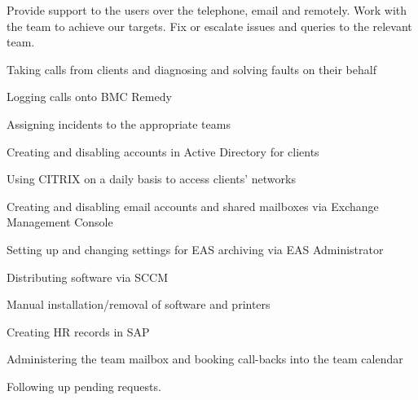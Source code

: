 \documentclass[a4paper]{deedy-resume}
\begin{document}
\begin{minipage}[t]{0.60\textwidth}
\item Provide support to the users over the telephone, email and remotely. Work with
the team to achieve our targets. Fix or escalate issues and queries to the relevant
team.
\sectionspace
\begin{tightitemize}
\item Taking calls from clients and diagnosing and solving faults on their behalf 
\item Logging calls onto BMC Remedy 
\item Assigning incidents to the appropriate teams
\item Creating and disabling accounts in Active Directory for clients
\item Using CITRIX on a daily basis to access clients’ networks
\item Creating and disabling email accounts and shared mailboxes via Exchange
Management Console
\item Setting up and changing settings for EAS archiving via EAS Administrator
\item Distributing software via SCCM
\item Manual installation/removal of software and printers
\item Creating HR records in SAP
\item Administering the team mailbox and booking call-backs into the team
calendar
\item Following up pending requests.
\end{tightitemize}

\sectionspace %


\end{minipage} %
\end{document}
